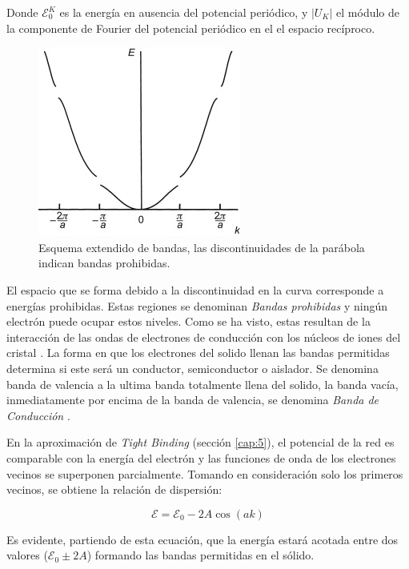 Donde $\mathcal{E}^{K}_0$ es la energía en ausencia del potencial periódico, y $|U_K|$ el módulo de la componente de Fourier del potencial periódico en el el espacio recíproco.

\begin{figure}[H]
    \centering
    \includegraphics[scale=1]{imagenes/esquema_bandas.jpg}
    \caption{Esquema extendido de bandas, las discontinuidades de la parábola indican bandas prohibidas.}
    \label{fig:1.1}
\end{figure}


 El espacio que se forma debido a la discontinuidad en la curva corresponde a energías prohibidas. Estas regiones se denominan \textit{Bandas prohibidas}  y ningún electrón puede ocupar estos niveles. Como se ha visto, estas  resultan de la interacción de las ondas de electrones de conducción con los núcleos de iones del cristal \cite{kittel}. La forma en que los electrones del solido llenan las bandas permitidas determina si este será un conductor, semiconductor o aislador. Se denomina banda de valencia a la ultima banda totalmente llena del solido,  la banda vacía, inmediatamente por encima de la banda de valencia, se denomina \textit{Banda de Conducción} \cite{valen}.

En la aproximación de \textit{Tight Binding} (sección \ref{cap:5}), el potencial de la red es comparable con la energía del electrón y las funciones de onda de los electrones vecinos se superponen parcialmente. Tomando en consideración solo los primeros vecinos, se obtiene la relación de dispersión:

\begin{equation}\label{eq:1.3}
    \mathcal{E}=\mathcal{E}_0-2A\cos(ak)
\end{equation}

Es evidente, partiendo de esta ecuación, que la energía estará acotada entre dos valores ($\mathcal{E}_0 \pm 2A$) formando las bandas permitidas en el sólido. 

